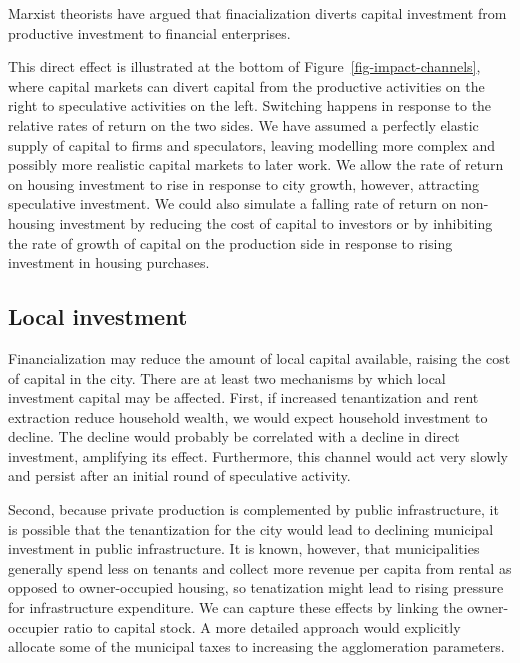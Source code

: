 Marxist theorists \cite{lefebvreRevolutionUrbaine1970, harveyClassmonopolyRentFinance1974, harveyUrbanProcessCapitalism1978, christophersRevisitingUrbanizationCapital2011} have argued that finacialization diverts capital investment from productive investment to financial enterprises. 

This direct effect is illustrated at the bottom of Figure~\ref{fig-impact-channels}, where capital markets can divert capital from the productive activities on the right to speculative activities on the left.  Switching happens in response to the relative rates of return on the two sides. We have assumed a perfectly elastic supply of capital to firms and speculators, leaving modelling more complex and possibly more realistic capital markets to later work.  We allow the rate of return on housing investment to rise in response to city growth, however, attracting speculative investment. We could also simulate a falling rate of return on non-housing investment by reducing the cost of capital to investors or by inhibiting the rate of growth of capital on the production side in response to rising investment in housing purchases. %



\subsection{Local investment}

Financialization may reduce the amount of local capital available, raising the cost of capital in the city. 
There are at least two mechanisms by which local investment capital may be affected. First, if increased tenantization and rent extraction reduce household wealth, we would expect household investment to decline. The decline would probably be correlated with a decline in direct investment, amplifying its effect. Furthermore, this channel would act very slowly and persist after an initial round of speculative activity. 

Second, because private production is complemented by public infrastructure, it is possible that the tenantization for the city would lead to declining municipal investment in public infrastructure. It is known, however, that municipalities generally spend less on tenants and collect more revenue per capita from rental as opposed to owner-occupied housing, so tenatization might lead to rising pressure for infrastructure expenditure.  We can capture these effects by linking the owner-occupier ratio to capital stock. A more detailed approach would explicitly allocate some of the municipal taxes to increasing the agglomeration parameters. 




